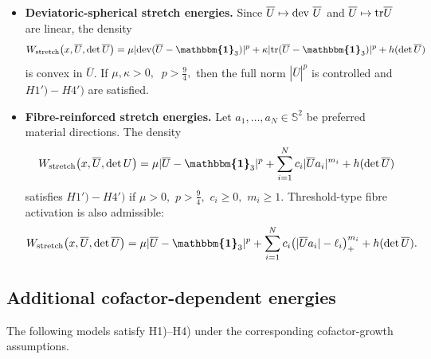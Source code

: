 \documentclass[11pt]{article}
\newcommand{\id}{{\boldsymbol{\mathbbm{1}}}}
\newcommand{\tr}{{\rm tr}}
\newcommand{\dev}{{\rm dev}}
\begin{document}
\begin{footnotesize}
\begin{itemize}
\item \textbf{Deviatoric-spherical stretch energies.}
Since $\overline U\mapsto \dev \ \overline U$ and $\overline U\mapsto \tr \overline U$ are linear, the density
\begin{align}
        W_{\rm stretch}\bigl(x,\overline U,\det \overline U\bigr)
        =
        \mu | \dev (\overline U-\id_3) | ^p
        +
        \kappa | \tr (\overline U-\id_3)| ^p
        +
        h(\det \overline U)
\end{align}
is convex in $\overline U$. If
$
        \mu,\kappa>0,
        \      $ $
        p>\frac{9}{4},
$
then the full norm $|\overline U|^p$ is controlled and $H1')-H4')$ are satisfied.

\item \textbf{Fibre-reinforced stretch energies.}
Let $a_1,\ldots,a_N\in\mathbb S^2$ be preferred material directions. The
density
\begin{align}
        W_{\rm stretch}\bigl(x,\overline U,\det U\bigr)
        =
        \mu  | \overline U-\id_3 | ^p
        +
        \sum_{i=1}^N c_i  | \overline Ua_i | ^{m_i}
        +
        h(\det \overline U)
\end{align}
satisfies $H1')-H4')$ if
$
        \mu>0,
       $ $
        p>\frac{9}{4},
        $ $
        c_i\geq0,
          $ $
        m_i\geq1.
$
Threshold-type fibre activation is also admissible:
\begin{align}
        W_{\rm stretch}\bigl(x,\overline U,\det \overline U\bigr)
        =
        \mu | \overline U-\id_3 | ^p
        +
        \sum_{i=1}^N
        c_i\bigl( | \overline Ua_i | -\ell_i\bigr)_+^{m_i}
        +
        h(\det\overline  U).
\end{align}

\end{itemize}

\subsection{Additional cofactor-dependent energies}

The following models satisfy H1)--H4) under the corresponding cofactor-growth assumptions.

\begin{itemize}


\end{itemize}
\end{footnotesize}
\end{document}

